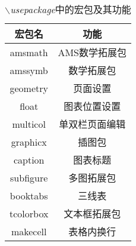 \documentclass[11pt]{article}
\begin{document}
    \begin{table}[H]
    	\centering
    	\caption{\textit{$\backslash$usepackage}中的宏包及其功能}
    	\setlength{\tabcolsep}{50pt}
    	\begin{tabular}{c|c}
    		\toprule
    		\textbf{宏包名} & \textbf{功能} \\
    		\midrule
    		amsmath & AMS数学拓展包 \\
    		amssymb & 数学拓展包 \\
    		\midrule
    		geometry & 页面设置 \\
    		float & 图表位置设置 \\
    		multicol & 单双栏页面编辑 \\
    		\midrule
    		graphicx & 插图包 \\
    		caption & 图表标题 \\
    		subfigure & 多图拓展包 \\
    		booktabs & 三线表 \\
    		tcolorbox & 文本框拓展包 \\
    		makecell & 表格内换行 \\
    		\bottomrule
    	\end{tabular}
    	\label{table3}
    \end{table}
    
\end{document}
